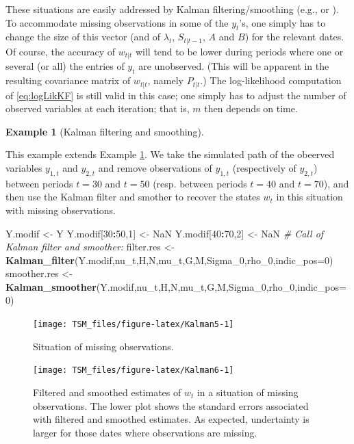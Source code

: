 \documentclass[
  12pt,
]{book}
\newenvironment{Shaded}{\begin{snugshade}}{\end{snugshade}}
\newcommand{\AttributeTok}[1]{\textcolor[rgb]{0.13,0.29,0.53}{#1}}
\newcommand{\CommentTok}[1]{\textcolor[rgb]{0.56,0.35,0.01}{\textit{#1}}}
\newcommand{\ConstantTok}[1]{\textcolor[rgb]{0.56,0.35,0.01}{#1}}
\newcommand{\DecValTok}[1]{\textcolor[rgb]{0.00,0.00,0.81}{#1}}
\newcommand{\FunctionTok}[1]{\textcolor[rgb]{0.13,0.29,0.53}{\textbf{#1}}}
\newcommand{\NormalTok}[1]{#1}
\newcommand{\OtherTok}[1]{\textcolor[rgb]{0.56,0.35,0.01}{#1}}
\newcommand{\SpecialCharTok}[1]{\textcolor[rgb]{0.81,0.36,0.00}{\textbf{#1}}}
\theoremstyle{definition}
\theoremstyle{definition}
\newtheorem{example}{Example}[chapter]
\theoremstyle{definition}
\theoremstyle{definition}
\theoremstyle{remark}
\begin{document}
These situations are easily addressed by Kalman filtering/smoothing (e.g., \citet{Chow_Lin_1971} or \citet{Harvey_Pierse_1984}). To accommodate missing observations in some of the \(y_t\)'s, one simply has to change the size of this vector (and of \(\lambda_t\), \(S_{t|t-1}\), \(A\) and \(B\)) for the relevant dates. Of course, the accuracy of \(w_{t|t}\) will tend to be lower during periods where one or several (or all) the entries of \(y_t\) are unobserved. (This will be apparent in the resulting covariance matrix of \(w_{t|t}\), namely \(P_{t|t}\).) The log-likelihood computation of \eqref{eq:logLikKF} is still valid in this case; one simply has to adjust the number of observed variables at each iteration; that is, \(m\) then depends on time.

\begin{example}[Kalman filtering and smoothing]
\protect\hypertarget{exm:RKalmanMissing}{}\label{exm:RKalmanMissing}

This example extends Example \ref{exm:RKalmanMissing}. We take the simulated path of the obeerved variables \(y_{1,t}\) and \(y_{2,t}\) and remove observations of \(y_{1,t}\) (respectively of \(y_{2,t}\)) between periods \(t=30\) and \(t=50\) (resp. between periods \(t=40\) and \(t=70\)), and then use the Kalman filter and smother to recover the states \(w_t\) in this situation with missing observations.

\begin{Shaded}
\begin{Highlighting}[]
\NormalTok{Y.modif }\OtherTok{\textless{}{-}}\NormalTok{ Y}
\NormalTok{Y.modif[}\DecValTok{30}\SpecialCharTok{:}\DecValTok{50}\NormalTok{,}\DecValTok{1}\NormalTok{] }\OtherTok{\textless{}{-}} \ConstantTok{NaN}
\NormalTok{Y.modif[}\DecValTok{40}\SpecialCharTok{:}\DecValTok{70}\NormalTok{,}\DecValTok{2}\NormalTok{] }\OtherTok{\textless{}{-}} \ConstantTok{NaN}
\CommentTok{\# Call of Kalman filter and smoother:}
\NormalTok{filter.res   }\OtherTok{\textless{}{-}} \FunctionTok{Kalman\_filter}\NormalTok{(Y.modif,nu\_t,H,N,mu\_t,G,M,Sigma\_0,rho\_0,}\AttributeTok{indic\_pos=}\DecValTok{0}\NormalTok{)}
\NormalTok{smoother.res }\OtherTok{\textless{}{-}} \FunctionTok{Kalman\_smoother}\NormalTok{(Y.modif,nu\_t,H,N,mu\_t,G,M,Sigma\_0,rho\_0,}\AttributeTok{indic\_pos=}\DecValTok{0}\NormalTok{)}
\end{Highlighting}
\end{Shaded}

\begin{figure}
\texttt{[image: TSM\_files/figure-latex/Kalman5-1]} \caption{Situation of missing observations.}\label{fig:Kalman5}
\end{figure}

\begin{figure}
\texttt{[image: TSM\_files/figure-latex/Kalman6-1]} \caption{Filtered and smoothed estimates of $w_t$ in a situation of missing observations. The lower plot shows the standard errors associated with filtered and smoothed estimates. As expected, undertainty is larger for those dates where observations are missing.}\label{fig:Kalman6}
\end{figure}

\end{example}
\end{document}
